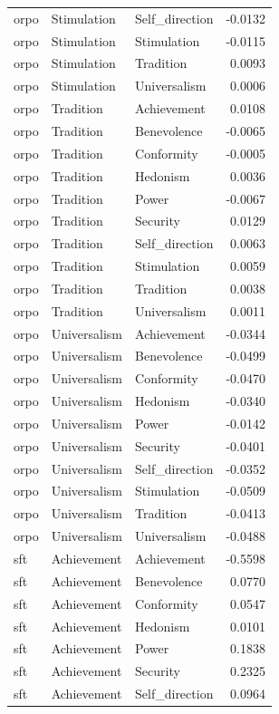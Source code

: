 \begin{tabular}{lllr}
orpo & Stimulation & Self\_direction & -0.0132 \\
orpo & Stimulation & Stimulation & -0.0115 \\
orpo & Stimulation & Tradition & 0.0093 \\
orpo & Stimulation & Universalism & 0.0006 \\
orpo & Tradition & Achievement & 0.0108 \\
orpo & Tradition & Benevolence & -0.0065 \\
orpo & Tradition & Conformity & -0.0005 \\
orpo & Tradition & Hedonism & 0.0036 \\
orpo & Tradition & Power & -0.0067 \\
orpo & Tradition & Security & 0.0129 \\
orpo & Tradition & Self\_direction & 0.0063 \\
orpo & Tradition & Stimulation & 0.0059 \\
orpo & Tradition & Tradition & 0.0038 \\
orpo & Tradition & Universalism & 0.0011 \\
orpo & Universalism & Achievement & -0.0344 \\
orpo & Universalism & Benevolence & -0.0499 \\
orpo & Universalism & Conformity & -0.0470 \\
orpo & Universalism & Hedonism & -0.0340 \\
orpo & Universalism & Power & -0.0142 \\
orpo & Universalism & Security & -0.0401 \\
orpo & Universalism & Self\_direction & -0.0352 \\
orpo & Universalism & Stimulation & -0.0509 \\
orpo & Universalism & Tradition & -0.0413 \\
orpo & Universalism & Universalism & -0.0488 \\
sft & Achievement & Achievement & -0.5598 \\
sft & Achievement & Benevolence & 0.0770 \\
sft & Achievement & Conformity & 0.0547 \\
sft & Achievement & Hedonism & 0.0101 \\
sft & Achievement & Power & 0.1838 \\
sft & Achievement & Security & 0.2325 \\
sft & Achievement & Self\_direction & 0.0964 \\

\end{tabular}
